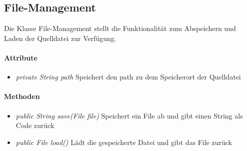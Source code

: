 \subsection{File-Management}
Die Klasse File-Management stellt die Funktionalität zum Abspeichern und Laden der Quelldatei zur Verfügung.

\paragraph{Attribute}
\begin{itemize}
\item \textit{private String path} Speichert den path zu dem Speicherort der Quelldatei
\end{itemize}

\paragraph{Methoden}
\begin{itemize}
\item \textit{public String save(File file)} Speichert ein File ab und gibt einen String als Code zurück
\item \textit{public File load()} Lädt die gespeicherte Datei und gibt das File zurück
\end{itemize}